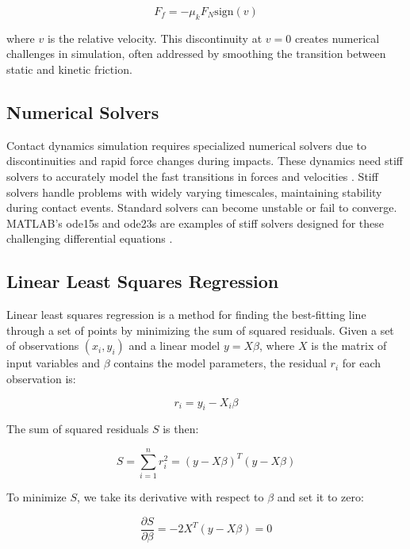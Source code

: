 \begin{equation}
\label{eq:kinetic_friction}
F_f = -\mu_k F_N \text{sign}(v)
\end{equation}

where \(v\) is the relative velocity. This discontinuity at \(v=0\) creates numerical challenges in simulation, often addressed by smoothing the transition between static and kinetic friction.

\subsection{Numerical Solvers}
\label{sec:numerical_solvers}

Contact dynamics simulation requires specialized numerical solvers due to discontinuities and rapid force changes during impacts. These dynamics need stiff solvers to accurately model the fast transitions in forces and velocities \cite{stiff_contact_ODE_1}\cite{stiff_contact_ODE_2}. Stiff solvers handle problems with widely varying timescales, maintaining stability during contact events. Standard solvers can become unstable or fail to converge. MATLAB's ode15s and ode23s are examples of stiff solvers designed for these challenging differential equations \cite{MATLAB_ODE}.


\subsection{Linear Least Squares Regression}
Linear least squares regression is a method for finding the best-fitting line through a set of points by minimizing the sum of squared residuals. Given a set of observations \((x_i, y_i)\) and a linear model \(y = X\beta\), where \(X\) is the matrix of input variables and \(\beta\) contains the model parameters, the residual \(r_i\) for each observation is:

\begin{equation}
\label{eq:residual}
r_i = y_i - X_i\beta
\end{equation}

The sum of squared residuals \(S\) is then:

\begin{equation}
\label{eq:sum_squared_residuals} 
S = \sum_{i=1}^n r_i^2 = (y - X\beta)^T(y - X\beta)
\end{equation}

To minimize \(S\), we take its derivative with respect to \(\beta\) and set it to zero:

\begin{equation}
\label{eq:derivative_residuals}
\frac{\partial S}{\partial \beta} = -2X^T(y - X\beta) = 0
\end{equation}

